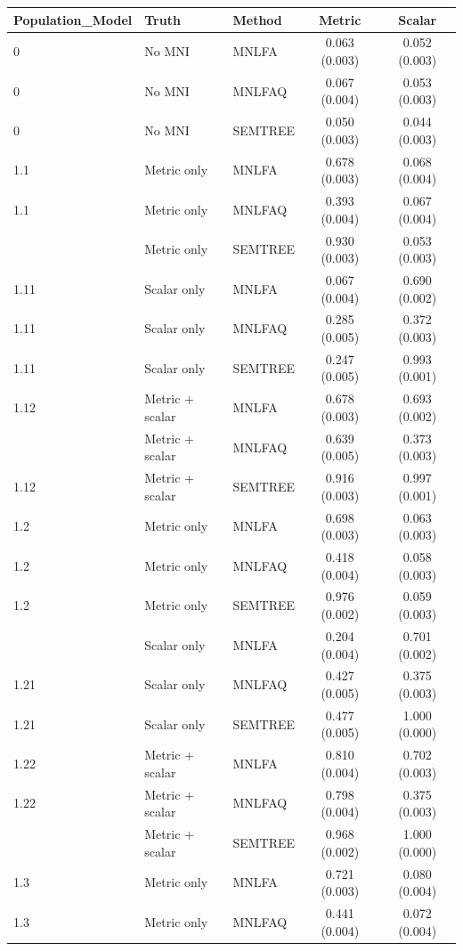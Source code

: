 \documentclass[
  man,
  floatsintext]{apa7}
\begin{document}
\begin{table}[H]
\centering

\begin{tabular}{lllcc}
\toprule
Population\_Model & Truth & Method & Metric & Scalar\\
\midrule
0 & No MNI & MNLFA & 0.063 (0.003) & 0.052 (0.003)\\
0 & No MNI & MNLFAQ & 0.067 (0.004) & 0.053 (0.003)\\
0 & No MNI & SEMTREE & 0.050 (0.003) & 0.044 (0.003)\\
1.1 & Metric only & MNLFA & 0.678 (0.003) & 0.068 (0.004)\\
1.1 & Metric only & MNLFAQ & 0.393 (0.004) & 0.067 (0.004)\\
\addlinespace
1.1 & Metric only & SEMTREE & 0.930 (0.003) & 0.053 (0.003)\\
1.11 & Scalar only & MNLFA & 0.067 (0.004) & 0.690 (0.002)\\
1.11 & Scalar only & MNLFAQ & 0.285 (0.005) & 0.372 (0.003)\\
1.11 & Scalar only & SEMTREE & 0.247 (0.005) & 0.993 (0.001)\\
1.12 & Metric + scalar & MNLFA & 0.678 (0.003) & 0.693 (0.002)\\
\addlinespace
1.12 & Metric + scalar & MNLFAQ & 0.639 (0.005) & 0.373 (0.003)\\
1.12 & Metric + scalar & SEMTREE & 0.916 (0.003) & 0.997 (0.001)\\
1.2 & Metric only & MNLFA & 0.698 (0.003) & 0.063 (0.003)\\
1.2 & Metric only & MNLFAQ & 0.418 (0.004) & 0.058 (0.003)\\
1.2 & Metric only & SEMTREE & 0.976 (0.002) & 0.059 (0.003)\\
\addlinespace
1.21 & Scalar only & MNLFA & 0.204 (0.004) & 0.701 (0.002)\\
1.21 & Scalar only & MNLFAQ & 0.427 (0.005) & 0.375 (0.003)\\
1.21 & Scalar only & SEMTREE & 0.477 (0.005) & 1.000 (0.000)\\
1.22 & Metric + scalar & MNLFA & 0.810 (0.004) & 0.702 (0.003)\\
1.22 & Metric + scalar & MNLFAQ & 0.798 (0.004) & 0.375 (0.003)\\
\addlinespace
1.22 & Metric + scalar & SEMTREE & 0.968 (0.002) & 1.000 (0.000)\\
1.3 & Metric only & MNLFA & 0.721 (0.003) & 0.080 (0.004)\\
1.3 & Metric only & MNLFAQ & 0.441 (0.004) & 0.072 (0.004)\\

\end{tabular}
\end{table}
\end{document}
